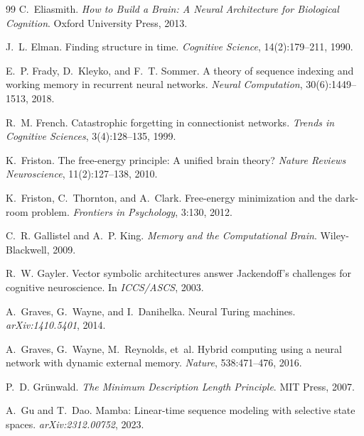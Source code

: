 \documentclass[11pt,a4paper]{article}
\theoremstyle{plain}
\theoremstyle{definition}
\theoremstyle{remark}
\begin{document}
\begin{thebibliography}{99}
C.~Eliasmith.
\newblock \emph{How to Build a Brain: A Neural Architecture for Biological
Cognition}.
\newblock Oxford University Press, 2013.

J.~L. Elman.
\newblock Finding structure in time.
\newblock \emph{Cognitive Science}, 14(2):179--211, 1990.

E.~P. Frady, D.~Kleyko, and F.~T. Sommer.
\newblock A theory of sequence indexing and working memory in recurrent neural
networks.
\newblock \emph{Neural Computation}, 30(6):1449--1513, 2018.

R.~M. French.
\newblock Catastrophic forgetting in connectionist networks.
\newblock \emph{Trends in Cognitive Sciences}, 3(4):128--135, 1999.

K.~Friston.
\newblock The free-energy principle: A unified brain theory?
\newblock \emph{Nature Reviews Neuroscience}, 11(2):127--138, 2010.

K.~Friston, C.~Thornton, and A.~Clark.
\newblock Free-energy minimization and the dark-room problem.
\newblock \emph{Frontiers in Psychology}, 3:130, 2012.

C.~R. Gallistel and A.~P. King.
\newblock \emph{Memory and the Computational Brain}.
\newblock Wiley-Blackwell, 2009.

R.~W. Gayler.
\newblock Vector symbolic architectures answer Jackendoff's challenges for
cognitive neuroscience.
\newblock In \emph{ICCS/ASCS}, 2003.

A.~Graves, G.~Wayne, and I.~Danihelka.
\newblock Neural Turing machines.
\newblock \emph{arXiv:1410.5401}, 2014.

A.~Graves, G.~Wayne, M.~Reynolds, et~al.
\newblock Hybrid computing using a neural network with dynamic external memory.
\newblock \emph{Nature}, 538:471--476, 2016.

P.~D. Gr\"{u}nwald.
\newblock \emph{The Minimum Description Length Principle}.
\newblock MIT Press, 2007.

A.~Gu and T.~Dao.
\newblock Mamba: Linear-time sequence modeling with selective state spaces.
\newblock \emph{arXiv:2312.00752}, 2023.


\end{thebibliography}
\end{document}
